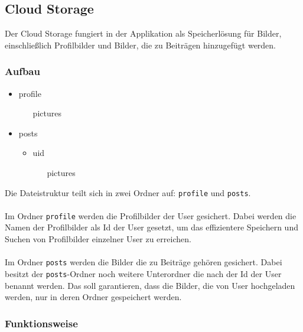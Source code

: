 \subsection{Cloud Storage}
Der Cloud Storage fungiert in der Applikation als Speicherlösung für Bilder, einschließlich Profilbilder und Bilder, die zu Beiträgen hinzugefügt werden.
\\
\subsubsection{Aufbau}
\begin{itemize}
  \item profile
        \begin{itemize}
          \item [pictures]
        \end{itemize}
  \item posts
        \begin{itemize}
          \item {uid}
                \begin{itemize}
                  \item [pictures]
                \end{itemize}
        \end{itemize}
\end{itemize}

Die Dateistruktur teilt sich in zwei Ordner auf: \texttt{profile} und \texttt{posts}.
\\\\
Im Ordner \texttt{profile} werden die Profilbilder der User gesichert. Dabei werden die Namen der Profilbilder als Id der User gesetzt, um das effizientere Speichern und Suchen von Profilbilder einzelner User zu erreichen.
\\\\
Im Ordner \texttt{posts} werden die Bilder die zu Beiträge gehören gesichert. Dabei besitzt der \texttt{posts}-Ordner noch weitere Unterordner die nach der Id der User benannt werden. Das soll garantieren, dass die Bilder, die von User hochgeladen werden, nur in deren Ordner gespeichert werden.

\subsubsection{Funktionsweise}

